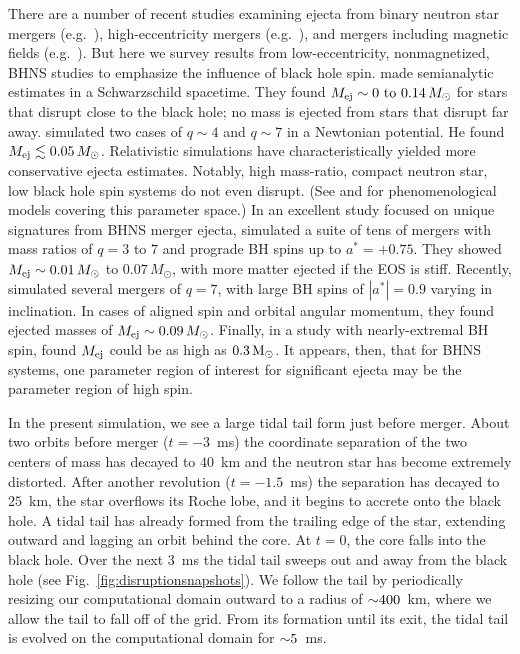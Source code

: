 There are a number of recent studies examining ejecta from
binary neutron star mergers (e.g.\ \citealt{ross2012-ejecta,hoto2013-ejecta}),
high-eccentricity mergers (e.g.\ \citealt{step2011-eccentric,east2012-eccentric,east2012-dynamical_capture}),
and mergers including magnetic fields (e.g.\ \citealt{chaw2010-magnetized}).
But here we survey results from low-eccentricity, nonmagnetized, BHNS studies
to emphasize the influence of black hole spin.
\cite{latt1974-bhns_ejecta} made semianalytic estimates in a Schwarzschild spacetime.
They found $M_{\rm ej} \sim 0{\rm\,\,to\,\,}0.14\,M_{\odot}$ for stars that disrupt
close to the black hole; no mass is ejected from stars that disrupt far away.
\cite{ross2012-ejecta} simulated two cases of $q\sim4$ and $q\sim7$ in a
Newtonian potential. He found $M_{\rm ej} \lesssim 0.05\,M_{\odot}$.
Relativistic simulations have characteristically yielded more
conservative ejecta estimates.
Notably, high mass-ratio, compact neutron star, low black hole spin systems do not even
disrupt. (See \citealt{pann2010-disk_mass} and \citealt{fouc2012-disk_mass} for phenomenological models
covering this parameter space.)
In an excellent study focused on unique signatures from BHNS merger ejecta,
\cite{kyut2013-ejecta} simulated a suite of tens of mergers
with mass ratios of $q=3$ to $7$ and prograde BH spins up to $a^{*}=+0.75$.
They showed $M_{\rm ej} \sim 0.01\,M_{\odot}$ to $0.07\,M_{\odot}$, with more matter ejected
if the EOS is stiff.
Recently, \cite{fouc2013-compactness_and_spin} simulated several
mergers of $q=7$, with large BH spins of $|a^{*}|=0.9$ varying in inclination.
In cases of aligned spin and orbital angular momentum, they found ejected
masses of $M_{\rm ej} \sim 0.09\,M_{\odot}$.
Finally, in a study with nearly-extremal BH spin, \cite{love2013-bhns_high_spin} found
$M_{\rm ej}$ could be as high as $0.3\rm\,M_{\odot}$.
It appears, then, that for BHNS systems, one parameter region of interest for significant ejecta
may be the parameter region of high spin.

In the present simulation, we see a large tidal tail form just before merger.
About two orbits before merger ($t=-3$~ms) the coordinate separation
of the two centers of mass has decayed to
$40$~km and the neutron star has become extremely distorted.
After another revolution ($t=-1.5$~ms) the separation has decayed to $25$~km,
the star overflows its Roche lobe, and it begins to accrete onto the black hole.
A tidal tail has already formed from the trailing edge of the star,
extending outward and lagging an orbit behind the core.
At $t=0$, the core falls into the black hole.
Over the next 3~ms the tidal tail sweeps out and
away from the black hole (see Fig.~\ref{fig:disruptionsnapshots}).
We follow the tail by periodically resizing our computational domain outward to
a radius of $\mathord{\sim}400$~km, where we allow the tail to fall off of the grid.
From its formation until its exit, the tidal tail is evolved on the computational domain
for $\mathord{\sim}5$~ms.

